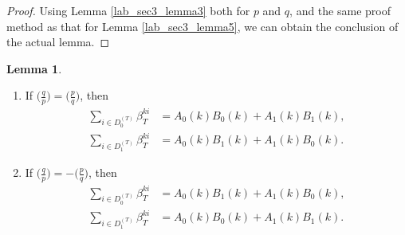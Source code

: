 \documentclass{mcom-l}
\theoremstyle{definition}
\newtheorem{sec3lemma7}[sec3lemma1]{Lemma}
\numberwithin{equation}{section}
\begin{document}
            \begin{proof}
            Using Lemma \ref{lab_sec3_lemma3} both for $ p $ and $ q $, and the same proof method as that for Lemma \ref{lab_sec3_lemma5}, we can obtain the conclusion of the actual lemma.
            \end{proof}
            \begin{sec3lemma7}\label{lab_sec3_lemma7}
            \begin{enumerate}
            \item
            If $ \bigl(\tfrac{q}{p}\bigr)=\bigl(\tfrac{p}{q}\bigr) $, then
            \begin{equation*}
            \begin{split}
            \sum_{i\in D_{0}^{(T)}}\beta_{T}^{ki}&= A_{0}(k)B_{0}(k)+A_{1}(k)B_{1}(k),\\
            \sum_{i\in D_{1}^{(T)}}\beta_{T}^{ki}&= A_{0}(k)B_{1}(k)+A_{1}(k)B_{0}(k).
            \end{split}
            \end{equation*}
            \item
             If $ \bigl(\tfrac{q}{p}\bigr)=-\bigl(\tfrac{p}{q}\bigr) $, then
             \begin{equation*}
             \begin{split}
              \sum_{i\in D_{0}^{(T)}}\beta_{T}^{ki}&= A_{0}(k)B_{1}(k)+A_{1}(k)B_{0}(k),\\
              \sum_{i\in D_{1}^{(T)}}\beta_{T}^{ki}&= A_{0}(k)B_{0}(k)+A_{1}(k)B_{1}(k).
              \end{split}
             \end{equation*}
            \end{enumerate}
            \end{sec3lemma7}
\end{document}
